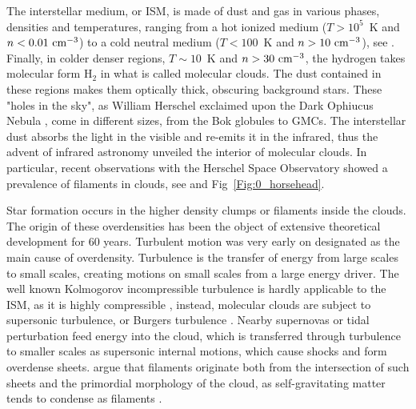 The interstellar medium, or ISM, is made of dust and gas in various phases, densities and temperatures, ranging from a hot ionized medium ($T>10^5 $~K and $n < 0.01 ~{\textrm{cm}}^{-3}$) to a cold neutral medium ($T<100$~K and $n > 10 ~{\textrm{cm}}^{-3}$),  see \cite{Field1969}. Finally, in colder denser regions, $T\sim 10$~K and $n>30~{\textrm{cm}}^{-3}$, the hydrogen takes molecular form H$_2$ in what is called molecular clouds. The dust contained in these regions makes them optically thick, obscuring background stars. These "holes in the sky", as William Herschel exclaimed upon the Dark Ophiucus Nebula \citep{Houghton1942}, come in different sizes, from the Bok globules to GMCs.
The interstellar dust absorbs the light in the visible and re-emits it in the infrared, thus the advent of infrared astronomy unveiled the interior of molecular clouds. In particular, recent observations with the Herschel Space Observatory showed a prevalence of filaments in clouds, see \cite{Andre2010} and Fig~\ref{Fig:0_horsehead}.

Star formation occurs in the higher density clumps or filaments inside the clouds. The origin of these overdensities has been the object of extensive theoretical development for 60 years. Turbulent motion was very early on designated as the main cause of overdensity. Turbulence is the transfer of energy from large scales to small scales, creating motions on small scales from a large energy driver. The well known Kolmogorov incompressible turbulence is hardly applicable to the ISM, as it is highly compressible \citep{Scalo1998}, instead, molecular clouds are subject to supersonic turbulence, or Burgers turbulence \citep{Frisch2001}. Nearby supernovas or tidal perturbation feed energy into the cloud, which is transferred through turbulence to smaller scales as supersonic internal motions, which cause shocks and form overdense sheets. \cite{McKee2007} argue that filaments originate both from the intersection of such sheets and the primordial morphology of the cloud, as self-gravitating matter tends to condense as filaments \citep{Springel2005}.

